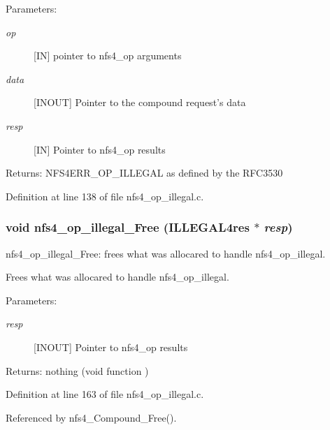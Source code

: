 \begin{Desc}
\item[Parameters:]
\begin{description}
\item[{\em op}][IN] pointer to nfs4\_\-op arguments \item[{\em data}][INOUT] Pointer to the compound request's data \item[{\em resp}][IN] Pointer to nfs4\_\-op results\end{description}
\end{Desc}
\begin{Desc}
\item[Returns:]NFS4ERR\_\-OP\_\-ILLEGAL as defined by the RFC3530 \end{Desc}


Definition at line 138 of file nfs4\_\-op\_\-illegal.c.
\subsubsection{\setlength{\rightskip}{0pt plus 5cm}void nfs4\_\-op\_\-illegal\_\-Free (ILLEGAL4res $\ast$ {\em resp})}\label{nfs4__op__illegal_8c_a1}


nfs4\_\-op\_\-illegal\_\-Free: frees what was allocared to handle nfs4\_\-op\_\-illegal.

Frees what was allocared to handle nfs4\_\-op\_\-illegal.

\begin{Desc}
\item[Parameters:]
\begin{description}
\item[{\em resp}][INOUT] Pointer to nfs4\_\-op results\end{description}
\end{Desc}
\begin{Desc}
\item[Returns:]nothing (void function ) \end{Desc}


Definition at line 163 of file nfs4\_\-op\_\-illegal.c.

Referenced by nfs4\_\-Compound\_\-Free().